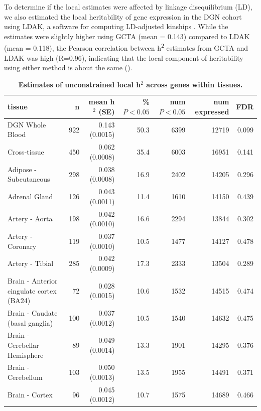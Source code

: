 \documentclass[10pt,letterpaper]{article}
\begin{document}
To determine if the local estimates were affected by linkage disequilibrium (LD), we also estimated the local heritability of gene expression in the DGN cohort using LDAK, a software for computing LD-adjusted kinships \cite{speed2012improved}. While the estimates were slightly higher using GCTA (mean = 0.143) compared to LDAK (mean = 0.118), the Pearson correlation between h\textsuperscript{2} estimates from GCTA and LDAK was high (R=0.96), indicating that the local component of heritability using either method is about the same ().

\begin{table}[!ht]
\begin{adjustwidth}{-2.25in}{0in} %
\caption{
{\bf Estimates of unconstrained local h$^2$ across genes within tissues.}}
\begin{tabular}{lrrrrrr}
  \hline
tissue & n & mean h$^2$ (SE) & \% $P<0.05$ & num $P<0.05$ & num expressed & FDR \\ 
  \hline
DGN Whole Blood & 922 & 0.143 (0.0015) & 50.3 & 6399 & 12719 & 0.099 \\ 
  Cross-tissue & 450 & 0.062 (0.0008) & 35.4 & 6003 & 16951 & 0.141 \\ 
  Adipose - Subcutaneous & 298 & 0.038 (0.0008) & 16.9 & 2402 & 14205 & 0.296 \\ 
  Adrenal Gland & 126 & 0.043 (0.0011) & 11.4 & 1610 & 14150 & 0.439 \\ 
  Artery - Aorta & 198 & 0.042 (0.0010) & 16.6 & 2294 & 13844 & 0.302 \\ 
  Artery - Coronary & 119 & 0.037 (0.0010) & 10.5 & 1477 & 14127 & 0.478 \\ 
  Artery - Tibial & 285 & 0.042 (0.0009) & 17.3 & 2333 & 13504 & 0.289 \\ 
  Brain - Anterior cingulate cortex (BA24) & 72 & 0.028 (0.0015) & 10.6 & 1532 & 14515 & 0.474 \\ 
  Brain - Caudate (basal ganglia) & 100 & 0.037 (0.0012) & 10.5 & 1540 & 14632 & 0.475 \\ 
  Brain - Cerebellar Hemisphere & 89 & 0.049 (0.0014) & 13.3 & 1901 & 14295 & 0.376 \\ 
  Brain - Cerebellum & 103 & 0.050 (0.0013) & 13.5 & 1955 & 14491 & 0.371 \\ 
  Brain - Cortex & 96 & 0.045 (0.0012) & 10.7 & 1575 & 14689 & 0.466 \\ 

\end{tabular}
\end{adjustwidth}
\end{table}
\end{document}
